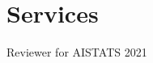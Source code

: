 \documentclass[11pt]{article}
\begin{document}


\section*{Services}

\hspace{-.25em}\begin{itemize*}[itemjoin={{ $\bullet$}}, label={}]
\item Reviewer for AISTATS 2021
\end{itemize*}



\end{document}
